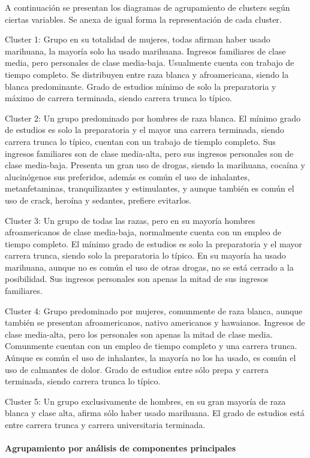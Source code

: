\documentclass[]{article}
\let\oldparagraph\paragraph
\renewcommand{\paragraph}[1]{\oldparagraph{#1}\mbox{}}
\begin{document}
A continuación se presentan los diagramas de agrupamiento de clusters
según ciertas variables. Se anexa de igual forma la representación de
cada cluster.

Cluster 1: Grupo en su totalidad de mujeres, todas afirman haber usado
marihuana, la mayoría solo ha usado marihuana. Ingresos familiares de
clase media, pero personales de clase media-baja. Usualmente cuenta con
trabajo de tiempo completo. Se distribuyen entre raza blanca y
afroamericana, siendo la blanca predominante. Grado de estudios mínimo
de solo la preparatoria y máximo de carrera terminada, siendo carrera
trunca lo típico.

Cluster 2: Un grupo predominado por hombres de raza blanca. El mínimo
grado de estudios es solo la preparatoria y el mayor una carrera
terminada, siendo carrera trunca lo típico, cuentan con un trabajo de
tiemplo completo. Sus ingresos familiares son de clase media-alta, pero
sus ingresos personales son de clase media-baja. Presenta un gran uso de
drogas, siendo la marihuana, cocaína y alucinógenos sus preferidos,
además es común el uso de inhalantes, metanfetaminas, tranquilizantes y
estimulantes, y aunque también es común el uso de crack, heroína y
sedantes, prefiere evitarlos.

Cluster 3: Un grupo de todas las razas, pero en su mayoría hombres
afroamericanos de clase media-baja, normalmente cuenta con un empleo de
tiempo completo. El mínimo grado de estudios es solo la preparatoria y
el mayor carrera trunca, siendo solo la preparatoria lo típico. En su
mayoría ha usado marihuana, aunque no es común el uso de otras drogas,
no se está cerrado a la posibilidad. Sus ingresos personales son apenas
la mitad de sus ingresos familiares.

Cluster 4: Grupo predominado por mujeres, comunmente de raza blanca,
aunque también se presentan afroamericanos, nativo americanos y
hawaianos. Ingresos de clase media-alta, pero los personales son apenas
la mitad de clase media. Comunmente cuentan con un empleo de tiempo
completo y una carrera trunca. Aúnque es común el uso de inhalantes, la
mayoría no los ha usado, es común el uso de calmantes de dolor. Grado de
estudios entre sólo prepa y carrera terminada, siendo carrera trunca lo
típico.

Cluster 5: Un grupo exclusivamente de hombres, en su gran mayoría de
raza blanca y clase alta, afirma sólo haber usado marihuana. El grado de
estudios está entre carrera trunca y carrera universitaria terminada.

\paragraph{Agrupamiento por análisis de componentes
principales}\label{agrupamiento-por-analisis-de-componentes-principales}
\end{document}
